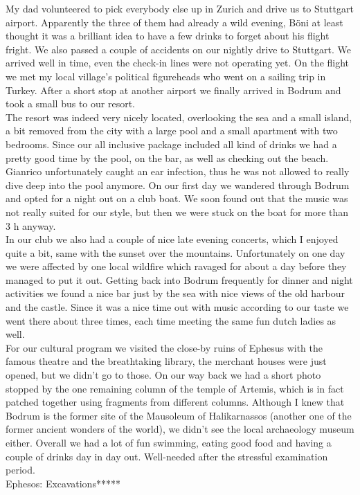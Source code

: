 My dad volunteered to pick everybody else up in Zurich and drive us to Stuttgart airport. Apparently the three of them had already a wild evening, B\"oni at least thought it was a brilliant idea to have a few drinks to forget about his flight fright. We also passed a couple of accidents on our nightly drive to Stuttgart. We arrived well in time, even the check-in lines were not operating yet. On the flight we met my local village's political figureheads who went on a sailing trip in Turkey. After a short stop at another airport we finally arrived in Bodrum and took a small bus to our resort.\\
The resort was indeed very nicely located, overlooking the sea and a small island, a bit removed from the city with a large pool and a small apartment with two bedrooms. Since our all inclusive package included all kind of drinks we had a pretty good time by the pool, on the bar, as well as checking out the beach. Gianrico unfortunately caught an ear infection, thus he was not allowed to really dive deep into the pool anymore. On our first day we wandered through Bodrum and opted for a night out on a club boat. We soon found out that the music was not really suited for our style, but then we were stuck on the boat for more than 3 h anyway.\\
 In our club we also had a couple of nice late evening concerts, which I enjoyed quite a bit, same with the sunset over the mountains. Unfortunately on one day we were affected by one local wildfire which ravaged for about a day before they managed to put it out. Getting back into Bodrum frequently for dinner and night activities we found a nice bar just by the sea with nice views of the old harbour and the castle. Since it was a nice time out with music according to our taste we went there about three times, each time meeting the same fun dutch ladies as well.\\
  For our cultural program we visited the close-by ruins of Ephesus with the famous theatre and the breathtaking library, the merchant houses were just opened, but we didn't go to those. On our way back we had a short photo stopped by the one remaining column of the temple of Artemis, which is in fact patched together using fragments from different columns. Although I knew that Bodrum is the former site of the Mausoleum of Halikarnassos (another one of the former ancient wonders of the world), we didn't see the local archaeology museum either. Overall we had a lot of fun swimming, eating good food and having a couple of drinks day in day out. Well-needed after the stressful examination period.\\

Ephesos: Excavations*****\\